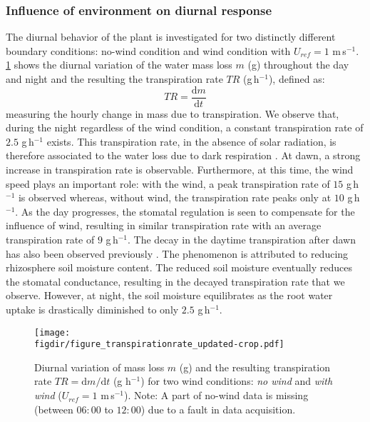 \subsubsection*{Influence of environment on diurnal response}

The diurnal behavior of the plant is investigated for two distinctly different boundary conditions: no-wind condition and wind condition with $U_{ref}=1$ m\,s$^{-1}$. \cref{fig:figure_transpirationrate} shows the diurnal variation of the water mass loss $m$ (g) throughout the day and night and the resulting the transpiration rate $TR$ (g\,h$^{-1}$), defined as:
\begin{equation}
TR = \frac{\mathrm{d}m}{\mathrm{d}t}
\end{equation}
measuring the hourly change in mass due to transpiration. We observe that, during the night regardless of the wind condition, a constant transpiration rate of $2.5$ g\,h$^{-1}$ exists. This transpiration rate, in the absence of solar radiation, is therefore associated to the water loss due to dark respiration \citep{Farquhar1980, Lambers2008, Launiainen2015}. At dawn, a strong increase in transpiration rate is observable. Furthermore, at this time, the wind speed plays an important role: with the wind, a peak transpiration rate of $15$ g\,h$^{-1}$ is observed whereas, without wind, the transpiration rate peaks only at $10$ g\,h$^{-1}$. As the day progresses, the stomatal regulation is seen to compensate for the influence of wind, resulting in similar transpiration rate with an average transpiration rate of $9$ g\,h$^{-1}$. The decay in the daytime transpiration after dawn has also been observed previously \citep{Javaux2013, Tuzet2003}. The phenomenon is attributed to reducing rhizosphere soil moisture content. The reduced soil moisture eventually reduces the stomatal conductance, resulting in the decayed transpiration rate that we observe. However, at night, the soil moisture equilibrates as the root water uptake is drastically diminished to only $2.5$ g\,h$^{-1}$.

\begin{figure}[t]
	\centering
	\texttt{[image: \\figdir/figure\_transpirationrate\_updated-crop.pdf]}
	\caption{Diurnal variation of mass loss $m$ (g) and the resulting transpiration rate $TR=\mathrm{d}m/\mathrm{d}t$ (g h$^{-1}$) for two wind conditions: \textit{no wind} and \textit{with wind} ($U_{ref}=1$ m\,s$^{-1}$). Note: A part of no-wind data is missing (between $06:00$ to $12:00$) due to a fault in data acquisition.}
	\label{fig:figure_transpirationrate}
\end{figure}

